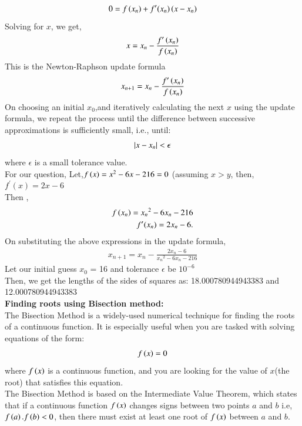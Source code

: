 \documentclass[journal]{IEEEtran}
\begin{document}
\begin{align}
    0 = f\left(x_n\right) + f^\prime(x_n)\left(x - x_n\right)
\end{align}
Solving for $x$, we get,
\begin{align}
    x = x_n - \frac{f^\prime\left(x_n\right)}{f\left(x_n\right)}
\end{align}
This is the Newton-Raphson update formula
\begin{align}
    x_{n+1} = x_n - \frac{f^\prime\left(x_n\right)}{f\left(x_n\right)}
\end{align}
On choosing an initial $x_0$,and iteratively calculating the next $x$ using the update formula, we repeat the process until the difference between successive approximations is sufficiently small, i.e., until:
\begin{align}
    \left\vert x - x_n\right\vert < \epsilon
\end{align}
where $\epsilon$ is a small tolerance value.\\
For our question, Let,$f\left(x\right) = x^2 - 6x - 216 = 0$ (assuming $x > y$, then, 
 $f^\prime(x) = 2x - 6$\\
Then , \\
\begin{align}
    f\left(x_n\right) = {x_n}^2 - 6x_n -216\\
    f^\prime(x_n) = 2x_n - 6.
\end{align}
On substituting the above expressions in the update formula,
\begin{align}
    x_{n+1} = x_n - \frac{2x_n - 6}{{x_n}^2 - 6x_n -216}
\end{align}
Let our initial guess $x_0$ = 16 and tolerance $\epsilon$ be $10^{-6}$\\
Then, we get the lengths of the sides of squares as: 18.000780944943383 and 12.000780944943383\\
\textbf{Finding roots using Bisection method:}
\\
The Bisection Method is a widely-used numerical technique for finding the roots of a continuous function. It is especially useful when you are tasked with solving equations of the form:
\begin{align}
    f\left(x\right) = 0
\end{align}
where $f\left(x\right)$ is a continuous function, and you are looking for the value of $x$(the root) that satisfies this equation.\\
The Bisection Method is based on the Intermediate Value Theorem, which states that if a continuous function $f\left(x\right)$ changes signs between two points $a$ and $b$ i.e, $f\left(a\right).f\left(b\right) < 0$, then there must exist at least one root of $f\left(x\right)$ between $a$ and $b$.\\
\end{document}
